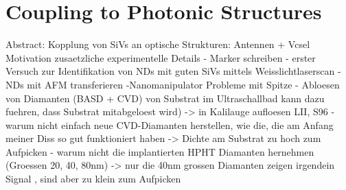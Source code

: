 
\chapter[Coupling NDs]{Coupling \Nds to Photonic Structures}	\label{ch::coupling}

	Abstract: Kopplung von SiVs an optische Strukturen: Antennen + Vcsel
	Motivation
	zusaetzliche experimentelle Details 
				- Marker schreiben
				- erster Versuch zur Identifikation von NDs mit guten SiVs mittels Weisslichtlaserscan
				- NDs mit AFM transferieren
				-Nanomanipulator
					Probleme mit Spitze
				- Abloesen von Diamanten (BASD + CVD) von Substrat im Ultraschallbad kann dazu fuehren, dass Substrat mitabgeloest wird) -> in Kalilauge aufloesen LII, S96
				- warum nicht einfach neue CVD-Diamanten herstellen, wie die, die am Anfang meiner Diss so gut funktioniert haben -> Dichte am Substrat zu hoch zum Aufpicken
				- warum nicht die implantierten HPHT Diamanten hernehmen (Groessen 20, 40, 80nm) -> nur die 40nm grossen Diamanten zeigen irgendein Signal , sind aber zu klein zum Aufpicken

